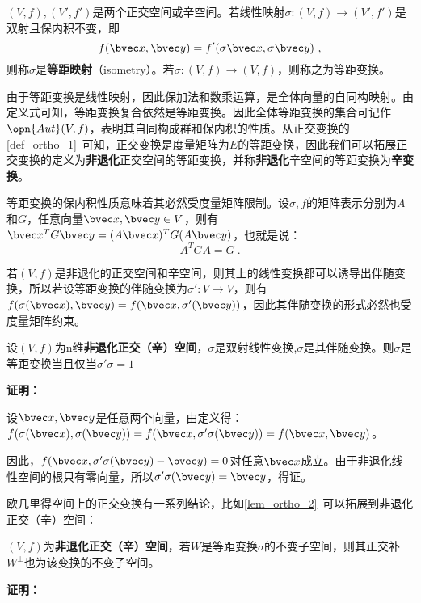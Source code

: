 


\begin{definition}{}
$(V,f),(V',f')$是两个正交空间或辛空间。若线性映射$\sigma:(V,f)\rightarrow (V',f')$是双射且保内积不变，即\begin{equation}
f(\bvec x,\bvec y)=f'(\sigma \bvec x,\sigma \bvec y)~,
\end{equation}
则称$\sigma $是\textbf{等距映射}（isometry）。若$\sigma:(V,f)\rightarrow (V,f)$，则称之为等距变换。
\end{definition}
由于等距变换是线性映射，因此保加法和数乘运算，是全体向量的自同构映射。由定义式可知，等距变换复合依然是等距变换。因此全体等距变换的集合可记作$\opn{Aut}(V,f)$，表明其自同构成群和保内积的性质。从正交变换的\autoref{def_ortho_1}~可知，正交变换是度量矩阵为$E$的等距变换，因此我们可以拓展正交变换的定义为\textbf{非退化}正交空间的等距变换，并称\textbf{非退化}辛空间的等距变换为\textbf{辛变换}。

等距变换的保内积性质意味着其必然受度量矩阵限制。设$\sigma,f$的矩阵表示分别为$A$和$G$，任意向量$\bvec x,\bvec y\in V$，则有$\bvec x^{T}G\bvec y=(A\bvec x)^TG(A\bvec y)$，也就是说：
\begin{equation}
A^TGA=G~.
\end{equation}

若$(V,f)$是非退化的正交空间和辛空间，则其上的线性变换都可以诱导出伴随变换，所以若设等距变换的伴随变换为$\sigma':V\rightarrow V$，则有$f(\sigma(\bvec x),\bvec y)=f(\bvec x,\sigma'(\bvec y))$，因此其伴随变换的形式必然也受度量矩阵约束。
\begin{theorem}{}
设$(V,f)$为n维\textbf{非退化正交（辛）空间}，$\sigma$是双射线性变换,$\sigma$是其伴随变换。则$\sigma$是等距变换当且仅当$\sigma'\sigma=1$
\end{theorem}
\textbf{证明：}

设$\bvec x,\bvec y$是任意两个向量，由定义得：$f(\sigma(\bvec x),\sigma(\bvec y))=f(\bvec x,\sigma'\sigma(\bvec y))=f(\bvec x,\bvec y)$。

因此，$f(\bvec x,\sigma'\sigma(\bvec y)-\bvec y)=0$对任意$\bvec x$成立。由于非退化线性空间的根只有零向量，所以$\sigma'\sigma(\bvec y)=\bvec y$，得证。

欧几里得空间上的正交变换有一系列结论，比如\autoref{lem_ortho_2}~可以拓展到非退化正交（辛）空间：
\begin{theorem}{}
$(V,f)$为\textbf{非退化正交（辛）空间}，若$W$是等距变换$\sigma$的不变子空间，则其正交补$W^{\bot}$也为该变换的不变子空间。
\end{theorem}
\textbf{证明：}

